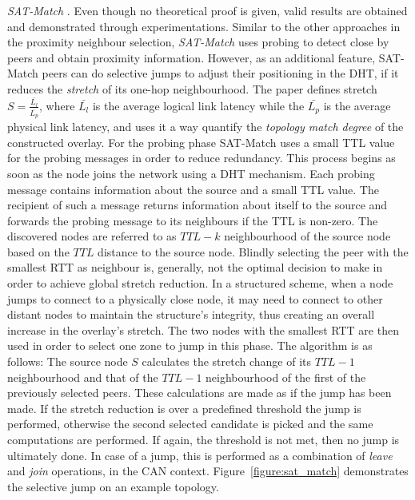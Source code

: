 \emph{SAT-Match} \cite{ren_satmatch_2004}. Even though no theoretical proof is
given, valid results are obtained and demonstrated through experimentations.
Similar to the other approaches in the proximity neighbour selection,
\textit{SAT-Match} uses probing to detect close by peers and obtain proximity
information. However, as an additional feature, SAT-Match peers can do
selective jumps to adjust their positioning in the DHT, if it reduces the
\emph{stretch} of its one-hop neighbourhood. The paper defines stretch
$S = \frac{\bar{L_l}}{\bar{L_p}}$, where $\bar{L_l}$ is the average
logical link latency while the $\bar{L_p}$ is the average physical
link latency, and uses it a way quantify the \emph{topology
match degree} of the constructed overlay. For the probing phase SAT-Match uses a
small TTL value for the probing messages in order to reduce
redundancy\cite{jiang_lightflood_2008}. This process begins as soon as the node
joins the network using a DHT mechanism. Each probing message contains
information about the source and a small TTL value. The recipient of such a
message returns information about itself to the source and forwards the probing
message to its neighbours if the TTL is non-zero. The discovered nodes are
referred to as $TTL-k$ neighbourhood of the source node based on the $TTL$
distance to the source node. Blindly selecting the peer with the smallest RTT
as neighbour is, generally, not the optimal decision to make in order to achieve
global stretch reduction. In a structured scheme, when a node jumps to connect
to a physically close node, it may need to connect to other distant nodes to
maintain the structure's integrity, thus creating an overall increase in the
overlay's stretch. The two nodes with the smallest RTT are then used in order to
select one zone to jump in this phase. The algorithm is as follows: The source
node $S$ calculates the stretch change of its $TTL-1$ neighbourhood and that of
the $TTL-1$ neighbourhood of the first of the previously selected peers. These
calculations are made as if the jump has been made. If the stretch reduction is
over a predefined threshold the jump is performed, otherwise the second selected
candidate is picked and the same computations are performed. If again, the
threshold is not met, then no jump is ultimately done. In case of a jump, this
is performed as a combination of \emph{leave} and \emph{join} operations, in the
CAN context. Figure~\ref{figure:sat_match} demonstrates the selective jump on an
example topology.

